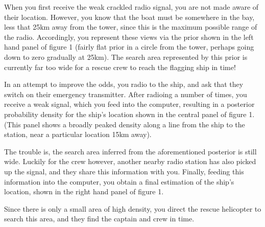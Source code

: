 \documentclass[11pt,fullpage]{book}
\begin{document}
When you first receive the weak crackled radio signal, you are not made aware of their location. However, you know that the boat must be somewhere in the bay, less that 25km away from the tower, since this is the maximum possible range of the radio. Accordingly, you represent these views via the prior shown in the left hand panel of figure 1 (fairly flat prior in a circle from the tower, perhaps going down to zero gradually at 25km). The search area represented by this prior is currently far too wide for a rescue crew to reach the flagging ship in time!

In an attempt to improve the odds, you radio to the ship, and ask that they switch on their emergency transmitter. After radioing a number of times, you receive a weak signal, which you feed into the computer, resulting in a posterior probability density for the ship's location shown in the central panel of figure 1. (This panel shows a broadly peaked density along a line from the ship to the station, near a particular location 15km away).

The trouble is, the search area inferred from the aforementioned posterior is still wide. Luckily for the crew however, another nearby radio station has also picked up the signal, and they share this information with you. Finally, feeding this information into the computer, you obtain a final estimation of the ship's location, shown in the right hand panel of figure 1. 

Since there is only a small area of high density, you direct the rescue helicopter to search this area, and they find the captain and crew in time.
\end{document}
